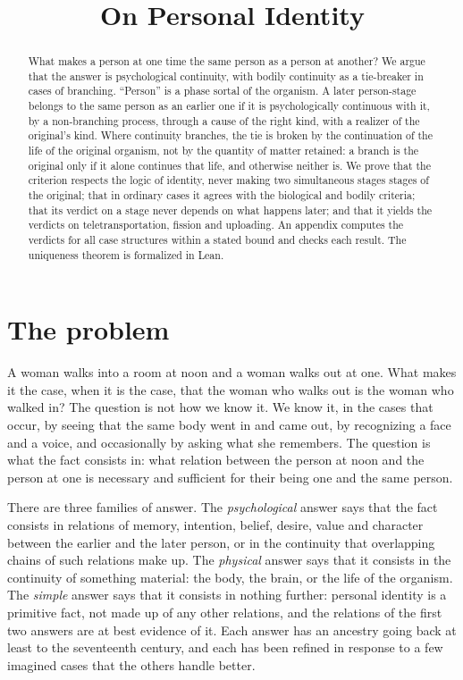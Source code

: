 \documentclass{situationist-preprint}
\title{On Personal Identity}
\begin{document}
\maketitle

\begin{abstract}
What makes a person at one time the same person as a person at another? We argue that the answer is psychological continuity, with bodily continuity as a tie-breaker in cases of branching. \enquote{Person} is a phase sortal of the organism. A later person-stage belongs to the same person as an earlier one if it is psychologically continuous with it, by a non-branching process, through a cause of the right kind, with a realizer of the original's kind. Where continuity branches, the tie is broken by the continuation of the life of the original organism, not by the quantity of matter retained: a branch is the original only if it alone continues that life, and otherwise neither is. We prove that the criterion respects the logic of identity, never making two simultaneous stages stages of the original; that in ordinary cases it agrees with the biological and bodily criteria; that its verdict on a stage never depends on what happens later; and that it yields the verdicts on teletransportation, fission and uploading. An appendix computes the verdicts for all \stcases{} case structures within a stated bound and checks each result. The uniqueness theorem is formalized in Lean.
\end{abstract}

\section{The problem}\label{s:problem}

A woman walks into a room at noon and a woman walks out at one. What makes it the case, when it is the case, that the woman who walks out is the woman who walked in? The question is not how we know it. We know it, in the cases that occur, by seeing that the same body went in and came out, by recognizing a face and a voice, and occasionally by asking what she remembers. The question is what the fact consists in: what relation between the person at noon and the person at one is necessary and sufficient for their being one and the same person.

There are three families of answer. The \emph{psychological} answer says that the fact consists in relations of memory, intention, belief, desire, value and character between the earlier and the later person, or in the continuity that overlapping chains of such relations make up. The \emph{physical} answer says that it consists in the continuity of something material: the body, the brain, or the life of the organism. The \emph{simple} answer says that it consists in nothing further: personal identity is a primitive fact, not made up of any other relations, and the relations of the first two answers are at best evidence of it. Each answer has an ancestry going back at least to the seventeenth century, and each has been refined in response to a few imagined cases that the others handle better.
\end{document}
